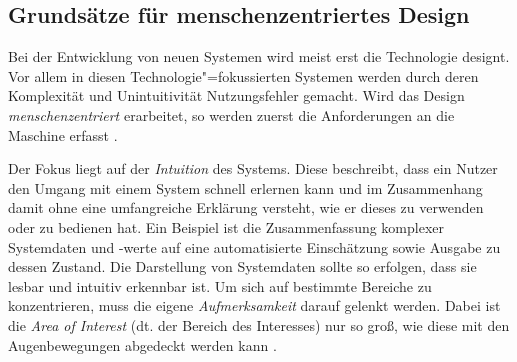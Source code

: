 \subsection{Grundsätze für menschenzentriertes Design}
\label{ch:SdF:UI:sec:menschenzentriertes_Design}

Bei der Entwicklung von neuen Systemen wird meist erst die Technologie designt. Vor allem in diesen Technologie"=fokussierten Systemen werden durch deren Komplexität und Unintuitivität Nutzungsfehler gemacht. Wird das Design \textit{menschenzentriert} erarbeitet, so werden zuerst die Anforderungen an die Maschine erfasst \cites[S. 53\psq]{Vollrath:2015:Taschenbuch}[S. 400]{Wickens:2013}.

Der Fokus liegt auf der \textit{Intuition} des Systems. Diese beschreibt, dass ein Nutzer den Umgang mit einem System schnell erlernen kann und im Zusammenhang damit ohne eine umfangreiche Erklärung versteht, wie er dieses zu verwenden oder zu bedienen hat. Ein Beispiel ist die Zusammenfassung komplexer Systemdaten und -werte auf eine automatisierte Einschätzung sowie Ausgabe zu dessen Zustand.
Die Darstellung von Systemdaten sollte so erfolgen, dass sie lesbar und intuitiv erkennbar ist.
Um sich auf bestimmte Bereiche zu konzentrieren, muss die eigene \textit{Aufmerksamkeit} darauf gelenkt werden. Dabei ist die \textit{Area of Interest} (dt. der Bereich des Interesses) nur so groß, wie diese mit den Augenbewegungen abgedeckt werden kann \cites[S. 153]{Vollrath:2015:Taschenbuch}[S. 52\psqq]{Wickens:2013}.

